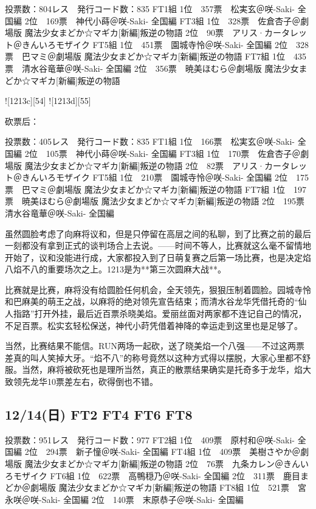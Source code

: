     投票数：804レス　発行コード数：835
    FT1組
    1位　357票　松実玄＠咲-Saki- 全国編
    2位　169票　神代小蒔＠咲-Saki- 全国編
    FT3組
    1位　328票　佐倉杏子＠劇場版 魔法少女まどか☆マギカ[新編]叛逆の物語
    2位　90票　アリス·カータレット＠きんいろモザイク
    FT5組
    1位　451票　園城寺怜＠咲-Saki- 全国編
    2位　328票　巴マミ＠劇場版 魔法少女まどか☆マギカ[新編]叛逆の物語
    FT7組
    1位　435票　清水谷竜華＠咲-Saki- 全国編
    2位　356票　暁美ほむら＠劇場版 魔法少女まどか☆マギカ[新編]叛逆の物語

![1213c][54]
![1213d][55]

砍票后：

    投票数：405レス　発行コード数：835
    FT1組
    1位　166票　松実玄＠咲-Saki- 全国編
    2位　105票　神代小蒔＠咲-Saki- 全国編
    FT3組
    1位　170票　佐倉杏子＠劇場版 魔法少女まどか☆マギカ[新編]叛逆の物語
    2位　82票　アリス·カータレット＠きんいろモザイク
    FT5組
    1位　210票　園城寺怜＠咲-Saki- 全国編
    2位　175票　巴マミ＠劇場版 魔法少女まどか☆マギカ[新編]叛逆の物語
    FT7組
    1位　197票　暁美ほむら＠劇場版 魔法少女まどか☆マギカ[新編]叛逆の物語
    2位　195票　清水谷竜華＠咲-Saki- 全国編

虽然圆脸考虑了向麻将议和，但是只停留在高层之间的私聊，到了比赛之前的最后一刻都没有拿到正式的谈判场合上去说。——时间不等人，比赛就这么毫不留情地开始了，议和没能进行成，大家都投入到了日萌复赛之后第一场比赛，也是决定焰八焰不八的重要场次之上。1213是为**第三次圆麻大战**。

比赛就是比赛，麻将没有给圆脸任何机会，全天领先，狠狠压制着圆脸。园城寺怜和巴麻美的萌王之战，以麻将的绝对领先宣告结束；而清水谷龙华凭借托奇的“仙人指路”打开外挂，最后近百票杀晓美焰。爱丽丝面对两家都不连记自己的情况，不足百票。松实玄轻松保送，神代小莳凭借着神降的幸运走到这里也是足够了。

当然，比赛结果不能信。RUN两场一起砍，送了晓美焰一个八强——不过这两票差真的叫人笑掉大牙。“焰不八”的称号竟然以这种方式得以摆脱，大家心里都不舒服。当然，麻将被砍死也是理所当然，真正的散票结果确实是托奇多于龙华，焰大致领先龙华10票差左右，砍得倒也不错。

\subsection{12/14(日) FT2 FT4 FT6 FT8}

    投票数：951レス　発行コード数：977
    FT2組
    1位　409票　原村和＠咲-Saki- 全国編
    2位　294票　新子憧＠咲-Saki- 全国編
    FT4組
    1位　409票　美樹さやか＠劇場版 魔法少女まどか☆マギカ[新編]叛逆の物語
    2位　76票　九条カレン＠きんいろモザイク
    FT6組
    1位　622票　高鴨穏乃＠咲-Saki- 全国編
    2位　311票　鹿目まどか＠劇場版 魔法少女まどか☆マギカ[新編]叛逆の物語
    FT8組
    1位　521票　宮永咲＠咲-Saki- 全国編
    2位　140票　末原恭子＠咲-Saki- 全国編


